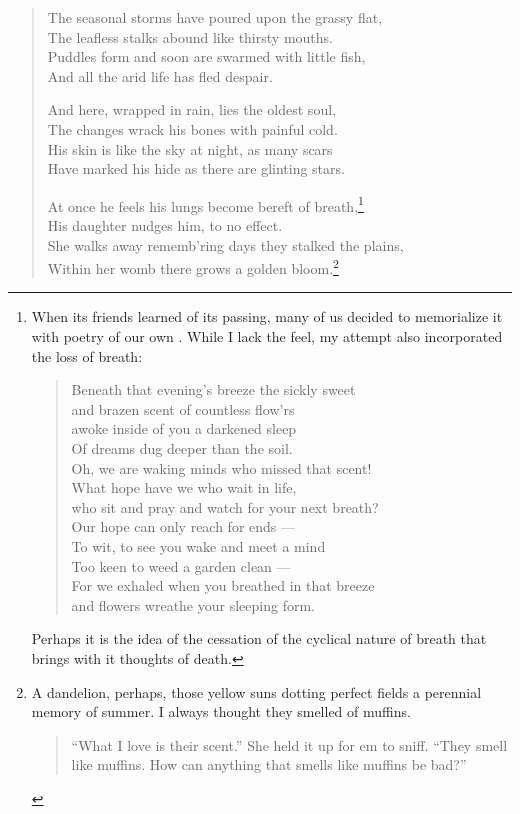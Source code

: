 \documentclass[12pt,oneside]{memoir}
\begin{document}
\begin{verse}
The seasonal storms have poured upon the grassy flat, \\
The leafless stalks abound like thirsty mouths. \\
Puddles form and soon are swarmed with little fish, \\
And all the arid life has fled despair.

And here, wrapped in rain, lies the oldest soul, \\
The changes wrack his bones with painful cold. \\
His skin is like the sky at night, as many scars \\
Have marked his hide as there are glinting stars.

At once he feels his lungs become bereft of breath,\footnote{When its friends learned of its passing, many of us decided to memorialize it with poetry of our own \parencite{memorial}. While I lack the feel, my attempt also incorporated the loss of breath: \begin{verse}Beneath that evening's breeze the sickly sweet \\ \vin and brazen scent of countless flow'rs \\ awoke inside of you a darkened sleep \\ \vin Of dreams dug deeper than the soil. \\ Oh, we are waking minds who missed that scent! \\ \vin What hope have we who wait in life, \\ who sit and pray and watch for your next breath? \\ \vin Our hope can only reach for ends --- \\ To wit, to see you wake and meet a mind \\ \vin Too keen to weed a garden clean --- \\ For we exhaled when you breathed in that breeze \\ \vin and flowers wreathe your sleeping form.\end{verse} Perhaps it is the idea of the cessation of the cyclical nature of breath that brings with it thoughts of death.} \\
His daughter nudges him, to no effect. \\
She walks away rememb'ring days they stalked the plains, \\
Within her womb there grows a golden bloom.\footnote{A dandelion, perhaps, those yellow suns dotting perfect fields a perennial memory of summer. I always thought they smelled of muffins.\begin{quote}
``What I love is their scent.'' She held it up for em to sniff. ``They smell like muffins. How can anything that smells like muffins be bad?''\par
\parencite[162]{toledot}
\end{quote}}

\parencite[26]{leaves}
\end{verse}
\end{document}
